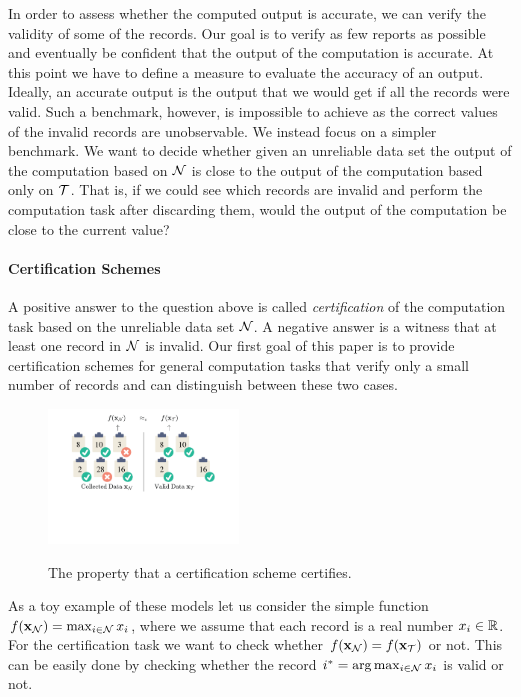   In order to assess whether the computed output is accurate, we can verify the validity of some of the records. Our goal is to verify as few
reports as possible and eventually be confident that the output of the computation is accurate. At this point we have to define a measure to
evaluate the accuracy of an output. Ideally, an accurate output is the output that we would get if all the records were valid. Such a benchmark,
however, is impossible to achieve as the correct values of the invalid records are unobservable. We instead focus on a simpler benchmark. We want
to decide whether given an unreliable data set the output of the computation based on $\mathcal{N}$ is close to the output of the computation based
only on $\mathcal{T}$. That is, if we could see which records are invalid and perform the computation task after discarding them, would the output
of the computation be close to the current value?

\paragraph{Certification Schemes} A positive answer to the question above is called \textit{certification} of the computation task based on the
unreliable data set $\mathcal{N}$. A negative answer is a witness that at least one record in $\mathcal{N}$ is invalid. Our first goal of this paper is to provide certification schemes for general computation
tasks that verify only a small number of records and can distinguish between these two cases.

\begin{figure}[!h] \label{fig:immunity}
  \centering
  {\includegraphics[clip, trim=2cm 8cm 2cm 1cm,width=0.45\textwidth]{figure2_new.pdf}}
  \caption{The property that a certification scheme certifies.}
\end{figure}

As a toy example of these models let us consider the simple function $f(\mathbf{x}_{\mathcal{N}}) = \max_{i \in \mathcal{N}} x_i$, where we assume that each record is a
real number $x_i \in \mathbb{R}$. For the certification task we want to check whether $f(\mathbf{x}_{\mathcal{N}}) = f(\mathbf{x}_{\mathcal{T}})$ or not. This can be easily done by checking
whether the record $i^* = \arg \max_{i \in \mathcal{N}} x_i$ is valid or not.

